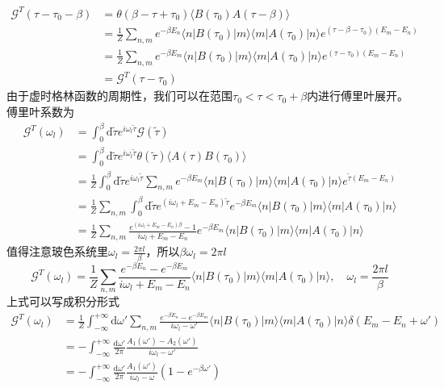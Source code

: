 \documentclass{article}
\numberwithin{equation}{subsection}
\begin{document}
\begin{equation}
    \begin{split}
        \mathcal{G}^T(\tau-\tau_0-\beta)&=\theta(\beta-\tau+\tau_0)\langle B(\tau_0)A(\tau-\beta)\rangle\\
        &=\frac{1}{Z}\sum_{n,m}e^{-\beta E_n}\langle n|B(\tau_0)|m\rangle\langle m|A(\tau_0)|n\rangle e^{(\tau-\beta-\tau_0)(E_m-E_n)}\\
        &=\frac{1}{Z}\sum_{n,m}e^{-\beta E_m}\langle n|B(\tau_0)|m\rangle\langle m|A(\tau_0)|n\rangle e^{(\tau-\tau_0)(E_m-E_n)}\\
        &=\mathcal{G}^T(\tau-\tau_0)
    \end{split}
\end{equation}
由于虚时格林函数的周期性，我们可以在范围$\tau_0<\tau<\tau_0+\beta$内进行傅里叶展开。傅里叶系数为
\begin{equation}
    \begin{split}
        \mathcal{G}^T(\omega_l)&=\int_{0}^{\beta}\mathrm{d}\tilde{\tau}e^{i\omega_l\tilde{\tau}}\mathcal{G}(\tilde{\tau})\\
        &=\int_{0}^{\beta}\mathrm{d}\tilde{\tau}e^{i\omega_l\tilde{\tau}}\theta(\tilde{\tau})\langle A(\tau)B(\tau_0)\rangle\\
        &=\frac{1}{Z}\int_{0}^{\beta}\mathrm{d}\tilde{\tau}e^{i\omega_l\tilde{\tau}}\sum_{n,m}e^{-\beta E_m}\langle n|B(\tau_0)|m\rangle\langle m|A(\tau_0)|n\rangle e^{\tilde{\tau}(E_m-E_n)}\\
        &=\frac{1}{Z}\sum_{n,m}\int_{0}^{\beta}\mathrm{d}\tilde{\tau}e^{(i\omega_l+E_m-E_n)\tilde{\tau}}e^{-\beta E_m}\langle n|B(\tau_0)|m\rangle\langle m|A(\tau_0)|n\rangle\\
        &=\frac{1}{Z}\sum_{n,m}\frac{e^{(i\omega_l+E_m-E_n)\beta}-1}{i\omega_l+E_m-E_n}e^{-\beta E_m}\langle n|B(\tau_0)|m\rangle\langle m|A(\tau_0)|n\rangle
    \end{split}
\end{equation}
值得注意玻色系统里$\omega_l=\frac{2\pi l}{\beta}$，所以$\beta\omega_l=2\pi l$
\begin{equation}
    \mathcal{G}^T(\omega_l)=\frac{1}{Z}\sum_{n,m}\frac{e^{-\beta E_n}-e^{-\beta E_m}}{i\omega_l+E_m-E_n}\langle n|B(\tau_0)|m\rangle\langle m|A(\tau_0)|n\rangle,\quad\omega_l=\frac{2\pi l}{\beta}
\end{equation}
上式可以写成积分形式
\begin{equation}
    \begin{split}
        \mathcal{G}^T(\omega_l)&=\frac{1}{Z}\int_{-\infty}^{+\infty}\mathrm{d}\omega'\sum_{n,m}\frac{e^{-\beta E_n}-e^{-\beta E_m}}{i\omega_l-\omega'}\langle n|B(\tau_0)|m\rangle\langle m|A(\tau_0)|n\rangle\delta(E_m-E_n+\omega')\\
        &=-\int_{-\infty}^{+\infty}\frac{\mathrm{d}\omega'}{2\pi}\frac{A_1(\omega')-A_2(\omega')}{i\omega_l-\omega'}\\
        &=-\int_{-\infty}^{+\infty}\frac{\mathrm{d}\omega'}{2\pi}\frac{A_1(\omega')}{i\omega_l-\omega}(1-e^{-\beta\omega'})
    \end{split}
\end{equation}
\end{document}

